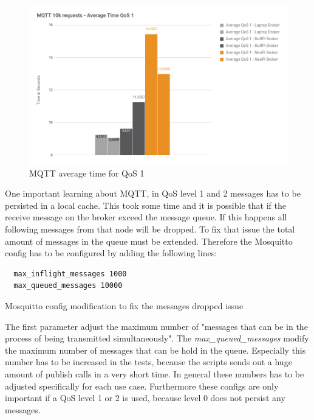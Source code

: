 \begin{figure}[H]
    \centering
    \includegraphics[width=\textwidth]{resources/images/performance_mqtt_average_time_qos_1.png}
    \caption[MQTT average time for QoS 1]{MQTT average time for QoS 1}
    \label{fig:performance_mqtt_average_time_qos_1}
\end{figure}

One important learning about MQTT, in \ac{QoS} level 1 and 2 messages has to be persisted in a local cache.
This took some time and it is possible that if the receive message on the broker exceed the message queue.
If this happens all following messages from that node will be dropped.
To fix that issue the total amount of messages in the queue must be extended.
Therefore the Mosquitto config has to be configured by adding the following lines:

\begin{listing}[H]
  \begin{verbatim}
  max_inflight_messages 1000
  max_queued_messages 10000
  \end{verbatim}
  \caption[Mosquitto config modification to fix the messages dropped issue]{Mosquitto config modification to fix the messages dropped issue}
  \label{code:performance_mosquitto_config}
\end{listing}

The first parameter adjust the maximum number of "messages that can be in the process of being transmitted simultaneously"\autocite{Mosquitto:Conf:Documentation}.
The \textit{max\_queued\_messages} modify the maximum number of messages that can be hold in the queue.\autocite[cf.]{Mosquitto:Conf:Documentation}
Especially this number has to be increased in the tests, because the scripts sends out a huge amount of publish calls in a very short time.
In general these numbers has to be adjusted specifically for each use case.
Furthermore these configs are only important if a \ac{QoS} level 1 or 2 is used, because level 0 does not persist any messages.
